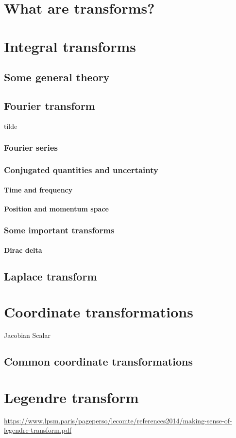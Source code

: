 \section{What are transforms?}

\section{Integral transforms}
\subsection{Some general theory}
\subsection{Fourier transform}
tilde
\subsubsection{Fourier series}
\subsubsection{Conjugated quantities and uncertainty}
\paragraph{Time and frequency}
\paragraph{Position and momentum space}
\subsubsection{Some important transforms}
\paragraph{Dirac delta}

\subsection{Laplace transform}

\section{Coordinate transformations}
Jacobian
Scalar
\subsection{Common coordinate transformations}

\section{Legendre transform}
\url{https://www.lpsm.paris/pageperso/lecomte/references2014/making-sense-of-legendre-transform.pdf}